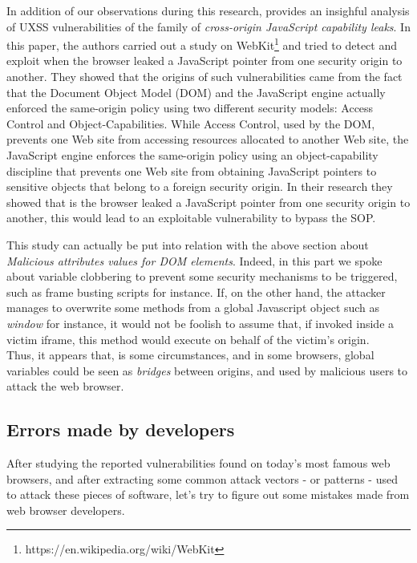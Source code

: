 \documentclass[journal]{IEEEtran}
\begin{document}
\bigskip

In addition of our observations during this research, \cite{uxssJSLeaks} provides an insighful analysis of UXSS vulnerabilities of the family of \emph{cross-origin JavaScript capability leaks}. In this paper, the authors carried out a study on WebKit\footnote{https://en.wikipedia.org/wiki/WebKit} and tried to detect and exploit when the browser leaked a JavaScript pointer from one security origin to another. They showed that the origins of such vulnerabilities came from the fact that the Document Object Model (DOM) and the JavaScript engine actually enforced the same-origin policy using two different security models: Access Control and Object-Capabilities. While Access Control, used by the DOM, prevents one Web site from accessing resources allocated to another Web site, the JavaScript engine enforces the same-origin policy using an object-capability discipline that prevents one Web site from obtaining JavaScript pointers to sensitive objects that belong to a foreign security origin. In their research they showed that is the browser leaked a JavaScript pointer from one security origin to another, this would lead to an exploitable vulnerability to bypass the SOP. 

\medskip

This study can actually be put into relation with the above section about \emph{Malicious attributes values for DOM elements}. Indeed, in this part we spoke about variable clobbering to prevent some security mechanisms to be triggered, such as frame busting scripts for instance. If, on the other hand, the attacker manages to overwrite some methods from a global Javascript object such as \emph{window} for instance, it would not be foolish to assume that, if invoked inside a victim iframe, this method would execute on behalf of the victim's origin. \\

Thus, it appears that, is some circumstances, and in some browsers, global variables could be seen as \emph{bridges} between origins, and used by malicious users to attack the web browser.


\subsection{Errors made by developers}

After studying the reported vulnerabilities found on today's most famous web browsers, and after extracting some common attack vectors - or patterns - used to attack these pieces of software, let's try to figure out some mistakes made from web browser developers.
\end{document}
